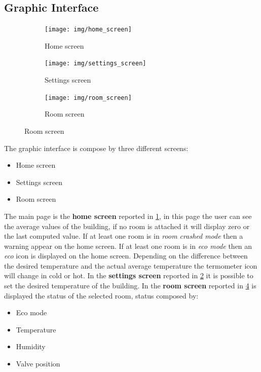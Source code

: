 \subsection{Graphic Interface}
\begin{figure}[h]
	\centering
	\begin{subfigure}{0.4\textwidth} %
		\texttt{[image: img/home\_screen]}
		\caption{Home screen}
		\label{fig:home_screen}
		\end{subfigure}
	\vspace{1em} %
	\begin{subfigure}{0.4\textwidth} %
		\texttt{[image: img/settings\_screen]}
		\caption{Settings screen}
		\label{fig:settings_screen}
	\end{subfigure}
	\begin{subfigure}{0.4\textwidth} %
		\texttt{[image: img/room\_screen]}
		\caption{Room screen}
		\label{fig:room_screen}
	\end{subfigure}
\end{figure}
The graphic interface is compose by three different screens:
\begin{itemize}
	\item Home screen
	\item Settings screen
	\item Room screen
\end{itemize}
The main page is the \textbf{home screen} reported in \ref{fig:home_screen}, in this page the user can see the average values of the building, 
if no room is attached it will display zero or the last computed value.
If at least one room is in \textit{room crashed mode} then a warning appear on the home screen.
If at least one room is in \textit{eco mode} then an \textit{eco} icon is displayed on the home screen.
Depending on the difference between the desired temperature and the actual average temperature the termometer icon will change in cold or hot.
In the \textbf{settings screen} reported in \ref{fig:settings_screen} it is possible to set the desired temperature of the building.
In the \textbf{room screen} reported in \ref{fig:room_screen} is displayed the status of the selected room, status composed by:
\begin{itemize}
	\item Eco mode
	\item Temperature
	\item Humidity
	\item Valve position
\end{itemize}
